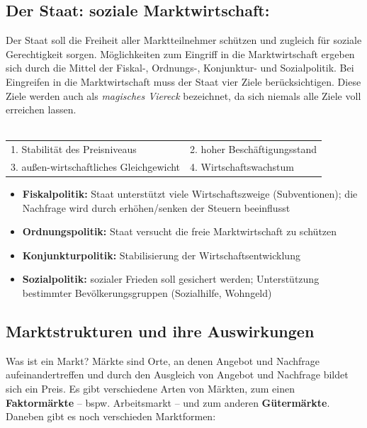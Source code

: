 \subsection{Der Staat: soziale Marktwirtschaft:}

Der Staat soll die Freiheit aller Marktteilnehmer schützen und zugleich für soziale Gerechtigkeit sorgen. Möglichkeiten zum Eingriff in die Marktwirtschaft ergeben sich durch die Mittel der Fiskal-, Ordnungs-, Konjunktur- und Sozialpolitik. Bei Eingreifen in die Marktwirtschaft muss der Staat vier Ziele berücksichtigen. Diese Ziele werden auch als {\it magisches Viereck} bezeichnet, da sich niemals alle Ziele voll erreichen lassen.\\\\
\begin{tabular}{ll}
1. Stabilität des Preisniveaus & 2. hoher Beschäftigungsstand\\
3. außen-wirtschaftliches Gleichgewicht & 4. Wirtschaftswachstum\\
\end{tabular}

\begin{itemize}
\setlength\itemsep{0em}
	\item {\bf Fiskalpolitik:} Staat unterstützt viele Wirtschaftszweige (Subventionen); die Nachfrage wird durch erhöhen/senken der Steuern beeinflusst
	\item {\bf Ordnungspolitik:} Staat versucht die freie Marktwirtschaft zu schützen
	\item {\bf Konjunkturpolitik:} Stabilisierung der Wirtschaftsentwicklung
	\item {\bf Sozialpolitik:} sozialer Frieden soll gesichert werden; Unterstützung bestimmter Bevölkerungsgruppen (Sozialhilfe, Wohngeld)
\end{itemize}
	

\subsection{Marktstrukturen und ihre Auswirkungen}

Was ist ein Markt? Märkte sind Orte, an denen Angebot und Nachfrage aufeinandertreffen und durch den Ausgleich von Angebot und Nachfrage bildet sich ein Preis. Es gibt verschiedene Arten von Märkten, zum einen {\bf Faktormärkte} -- bspw. Arbeitsmarkt -- und zum anderen {\bf Gütermärkte}. Daneben gibt es noch verschieden Marktformen:

